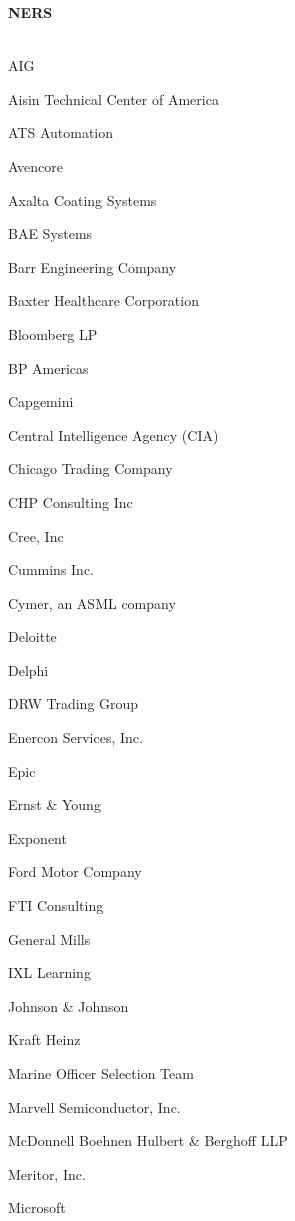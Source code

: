\documentclass[twoside]{article}
\begin{document}
\begin{center}
\begin{multicols}{5}
        {\fontsize{14}{16}\selectfont \bf NERS}\\
        \vspace{-1em}
        ~\hrulefill~
        \vspace{-.9em}
        \begin{FlushLeft}
        \begin{compactitem}
        \item AIG
\item Aisin Technical Center of America
\item ATS Automation
\item Avencore
\item Axalta Coating Systems
\item BAE Systems
\item Barr Engineering Company
\item Baxter Healthcare Corporation
\item Bloomberg LP
\item BP Americas
\item Capgemini
\item Central Intelligence Agency (CIA)
\item Chicago Trading Company
\item CHP Consulting Inc
\item Cree, Inc
\item Cummins Inc.
\item Cymer, an ASML company
\item Deloitte
\item Delphi
\item DRW Trading Group
\item Enercon Services, Inc.
\item Epic
\item Ernst \& Young
\item Exponent
\item Ford Motor Company
\item FTI Consulting
\item General Mills
\item IXL Learning
\item Johnson \& Johnson
\item Kraft Heinz
\item Marine Officer Selection Team
\item Marvell Semiconductor, Inc.
\item McDonnell Boehnen Hulbert \& Berghoff LLP
\item Meritor, Inc.
\item Microsoft

\end{compactitem}
\end{FlushLeft}
\end{multicols}
\end{center}
\end{document}
